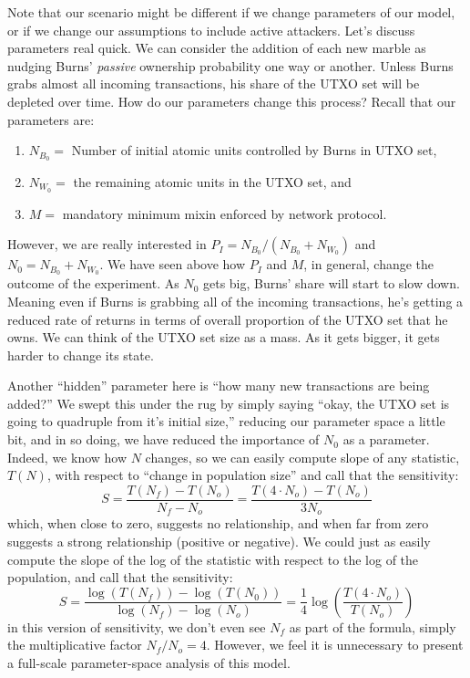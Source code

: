 \documentclass{mrl}
\begin{document}
Note that our scenario might be different if we change parameters of our model, or if we change our assumptions to include active attackers. Let's discuss parameters real quick. We can consider the addition of each new marble as nudging Burns' \emph{passive} ownership probability one way or another. Unless Burns grabs almost all incoming transactions, his share of the UTXO set will be depleted over time. How do our parameters change this process? Recall that our parameters are:
\begin{enumerate}
\item $N_{B_0} = $ Number of initial atomic units controlled by Burns in UTXO set,
\item $N_{W_0} = $ the remaining atomic units in the UTXO set, and
\item $M = $ mandatory minimum mixin enforced by network protocol.
\end{enumerate}
However, we are really interested in $P_I = N_{B_0}/(N_{B_0} + N_{W_0})$ and $N_0 = N_{B_0} + N_{W_0}$. We have seen above how $P_I$ and $M$, in general, change the outcome of the experiment. As $N_0$ gets big, Burns' share will start to slow down. Meaning even if Burns is grabbing all of the incoming transactions, he's getting a reduced rate of returns in terms of overall proportion of the UTXO set that he owns. We can think of the UTXO set size as a mass. As it gets bigger, it gets harder to change its state. 

Another ``hidden'' parameter here is ``how many new transactions are being added?'' We swept this under the rug by simply saying ``okay, the UTXO set is going to quadruple from it's initial size,'' reducing our parameter space a little bit, and in so doing, we have reduced the importance of $N_0$ as a parameter. Indeed, we know how $N$ changes, so we can easily compute slope of any statistic, $T(N)$, with respect to ``change in population size'' and call that the sensitivity:
\[S = \frac{T(N_f) - T(N_o)}{N_f - N_o} = \frac{T(4\cdot N_o) - T(N_o)}{3N_o}\]
which, when close to zero, suggests no relationship, and when far from zero suggests a strong relationship (positive or negative). We could just as easily compute the slope of the log of the statistic with respect to the log of the population, and call that the sensitivity:
\[S = \frac{\log(T(N_f)) - \log(T(N_0))}{\log(N_f)-\log(N_o)} = \frac{1}{4}\log\left(\frac{T(4\cdot N_o)}{T(N_o)}\right)\]
in this version of sensitivity, we don't even see $N_f$ as part of the formula, simply the multiplicative factor $N_f/N_o = 4$. However, we feel it is unnecessary to present a full-scale parameter-space analysis of this model.
\end{document}

